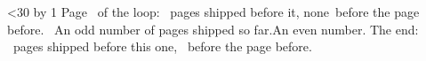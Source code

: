 \documentclass{article}
\newcounter{shipped}
\def\lastshipped{none}
\begin{document}
\loop\ifnum\pg<30
  \advance\pg by 1
  Page \the\pg\ of the loop: \theshipped\ pages shipped before it,
  \lastshipped\ before the page before.
  \ifodd\theshipped\ An odd number of pages shipped so far.\else An even number.\fi
  \xdef\lastshipped{\theshipped}%
  \newpage
\repeat
The end: \theshipped\ pages shipped before this one, \lastshipped\ before the page before.
\end{document}
